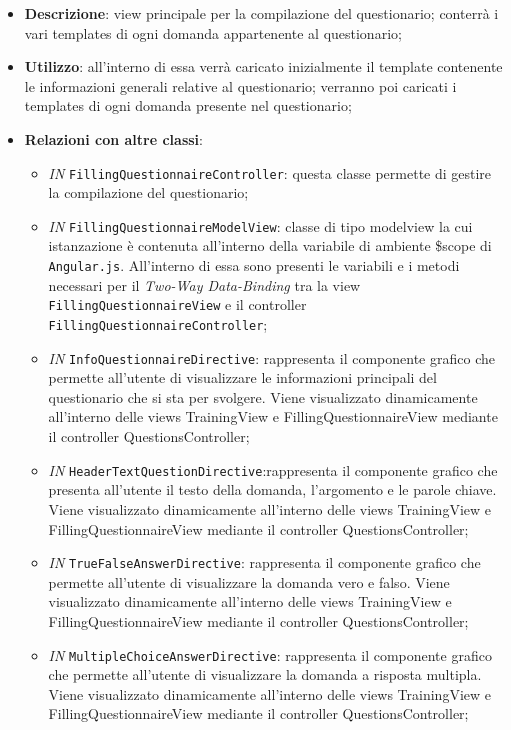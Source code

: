 \begin{itemize}
	\item \textbf{Descrizione}: view principale per la compilazione del questionario; conterrà i vari templates di ogni domanda appartenente al questionario;
	\item \textbf{Utilizzo}: all'interno di essa verrà caricato inizialmente il template contenente le informazioni generali relative al questionario; verranno poi caricati i templates di ogni domanda presente nel questionario;
	\item \textbf{Relazioni con altre classi}: 
	\begin{itemize}
		\item \textit{IN} \texttt{FillingQuestionnaireController}: questa classe permette di gestire la compilazione del questionario;
		\item \textit{IN} \texttt{FillingQuestionnaireModelView}: classe di tipo modelview la cui istanzazione è contenuta all'interno della variabile di ambiente \$scope di \texttt{Angular.js}. All'interno di essa sono presenti le variabili e i metodi necessari per il \textit{Two-Way Data-Binding} tra la view \texttt{FillingQuestionnaireView} e il controller \texttt{FillingQuestionnaireController};
		\item \textit{IN} \texttt{InfoQuestionnaireDirective}: rappresenta il componente grafico che permette all'utente di visualizzare le informazioni principali del questionario che si sta per svolgere. Viene visualizzato dinamicamente all'interno delle views TrainingView e FillingQuestionnaireView mediante il controller QuestionsController;
		\item \textit{IN} \texttt{HeaderTextQuestionDirective}:rappresenta il componente grafico che presenta all'utente il testo della domanda, l'argomento e le parole chiave. Viene visualizzato dinamicamente all'interno delle views TrainingView e FillingQuestionnaireView mediante il controller QuestionsController;
		\item \textit{IN} \texttt{TrueFalseAnswerDirective}: rappresenta il componente grafico che permette all'utente di visualizzare la domanda vero e falso. Viene visualizzato dinamicamente all'interno delle views TrainingView e FillingQuestionnaireView mediante il controller QuestionsController;
		\item \textit{IN} \texttt{MultipleChoiceAnswerDirective}: rappresenta il componente grafico che permette all'utente di visualizzare la domanda a risposta multipla. Viene visualizzato dinamicamente all'interno delle views TrainingView e FillingQuestionnaireView mediante il controller QuestionsController;

\end{itemize}
\end{itemize}

